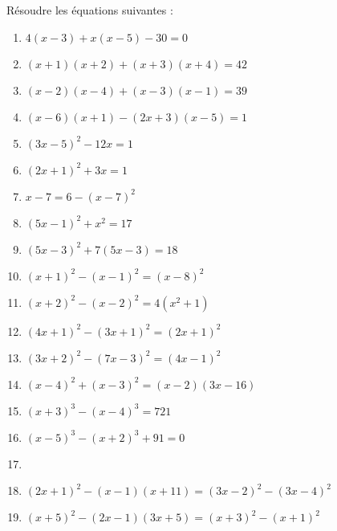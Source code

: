 \begin{exercice}
Résoudre les équations suivantes :
\begin{multicols}{2}
\begin{enumerate}
\item $4\left( x-3 \right)+x\left( x-5 \right)-30=0$ 
\item $\left( x+1 \right)\left( x+2 \right)+\left( x+3 \right)\left( x+4 \right)=42$ 
\item $\left( x-2 \right)\left( x-4 \right)+\left( x-3 \right)\left( x-1 \right)=39$ 
\item $\left( x-6 \right)\left( x+1 \right)-\left( 2x+3 \right)\left( x-5 \right)=1$ 
\item ${{\left( 3x-5 \right)}^{2}}-12x=1$ 
\item ${{\left( 2x+1 \right)}^{2}}+3x=1$ 
\item $x-7=6-{{\left( x-7 \right)}^{2}}$ 
\item ${{\left( 5x-1 \right)}^{2}}+{{x}^{2}}=17$ 
\item ${{\left( 5x-3 \right)}^{2}}+7\left( 5x-3 \right)=18$ 
\item ${{\left( x+1 \right)}^{2}}-{{\left( x-1 \right)}^{2}}={{\left( x-8 \right)}^{2}}$
\item ${{\left( x+2 \right)}^{2}}-{{\left( x-2 \right)}^{2}}=4\left( {{x}^{2}}+1 \right)$
\item ${{\left( 4x+1 \right)}^{2}}-{{\left( 3x+1 \right)}^{2}}={{\left( 2x+1 \right)}^{2}}$
\item ${{\left( 3x+2 \right)}^{2}}-{{\left( 7x-3 \right)}^{2}}={{\left( 4x-1 \right)}^{2}}$
\item ${{\left( x-4 \right)}^{2}}+{{\left( x-3 \right)}^{2}}=\left( x-2 \right)\left( 3x-16 \right)$
\item ${{\left( x+3 \right)}^{3}}-{{\left( x-4 \right)}^{3}}=721$
\item ${{\left( x-5 \right)}^{3}}-{{\left( x+2 \right)}^{3}}+91=0$
\item \item ${{\left( 2x+1 \right)}^{2}}-\left( x-1 \right)\left( x+11 \right)={{\left( 3x-2 \right)}^{2}}-{{\left( 3x-4 \right)}^{2}}$
\item ${{\left( x+5 \right)}^{2}}-\left( 2x-1 \right)\left( 3x+5 \right)={{\left( x+3 \right)}^{2}}-{{\left( x+1 \right)}^{2}}$
\end{enumerate}
\end{multicols}
\end{exercice}

